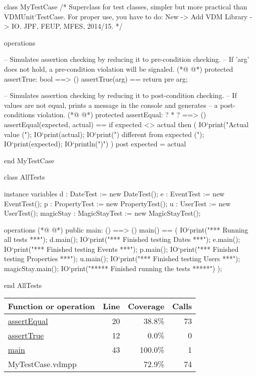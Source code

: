 \begin{vdmpp}[breaklines=true]
class MyTestCase
/*
  Superclass for test classes, simpler but more practical than VDMUnit`TestCase. 
  For proper use, you have to do: New -> Add VDM Library -> IO.
  JPF, FEUP, MFES, 2014/15.
*/

operations

 -- Simulates assertion checking by reducing it to pre-condition checking.
 -- If 'arg' does not hold, a pre-condition violation will be signaled.
(*@
\label{assertTrue:12}
@*)
 protected assertTrue: bool ==> ()
 assertTrue(arg) == 
  return 
 pre arg;
  
 -- Simulates assertion checking by reducing it to post-condition checking.
 -- If values are not equal, prints a message in the console and generates 
 -- a post-conditions violation.
(*@
\label{assertEqual:20}
@*)
 protected assertEqual: ? * ? ==> ()
 assertEqual(expected, actual) == 
  if expected <> actual then (
     IO`print("Actual value (");
     IO`print(actual); 
     IO`print(") different from expected (");
     IO`print(expected);
     IO`println(")\n")
  )
post expected = actual

end MyTestCase

class AllTests

instance variables
 d : DateTest := new DateTest();
 e : EventTest := new EventTest();
 p : PropertyTest := new PropertyTest();
 u : UserTest := new UserTest();
 magicStay : MagicStayTest := new MagicStayTest();

operations
(*@
\label{main:43}
@*)
 public  main: () ==> ()
  main() ==
  (
   IO`print("*** Running all tests ***\n");
   d.main();
   IO`print("*** Finished testing Dates ***\n");
   e.main();
   IO`print("*** Finished testing Events ***\n");
   p.main();
   IO`print("*** Finished testing Properties ***\n");
   u.main();
   IO`print("*** Finished testing Users ***\n");
   magicStay.main();
   IO`print("***** Finished running the tests *****\n")
  );

end AllTests
\end{vdmpp}
\bigskip
\begin{longtable}{|l|r|r|r|}
\hline
Function or operation & Line & Coverage & Calls \\
\hline
\hline
\hyperref[assertEqual:20]{assertEqual} & 20&38.8\% & 73 \\
\hline
\hyperref[assertTrue:12]{assertTrue} & 12&0.0\% & 0 \\
\hline
\hyperref[main:43]{main} & 43&100.0\% & 1 \\
\hline
\hline
MyTestCase.vdmpp & & 72.9\% & 74 \\
\hline
\end{longtable}

